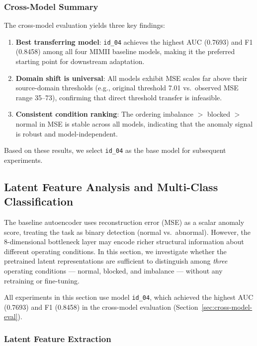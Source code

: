 \documentclass[12pt, a4paper]{article}
\begin{document}
\subsubsection{Cross-Model Summary}

The cross-model evaluation yields three key findings:
\begin{enumerate}
    \item \textbf{Best transferring model}: \texttt{id\_04} achieves the highest AUC (0.7693) and F1 (0.8458) among all four MIMII baseline models, making it the preferred starting point for downstream adaptation.
    \item \textbf{Domain shift is universal}: All models exhibit MSE scales far above their source-domain thresholds (e.g., original threshold 7.01 vs.\ observed MSE range 35--73), confirming that direct threshold transfer is infeasible.
    \item \textbf{Consistent condition ranking}: The ordering imbalance $>$ blocked $>$ normal in MSE is stable across all models, indicating that the anomaly signal is robust and model-independent.
\end{enumerate}

Based on these results, we select \texttt{id\_04} as the base model for subsequent experiments.


\subsection{Latent Feature Analysis and Multi-Class Classification}
\label{sec:latent-analysis}

The baseline autoencoder uses reconstruction error (MSE) as a scalar anomaly score, treating the task as binary detection (normal vs.\ abnormal). However, the 8-dimensional bottleneck layer may encode richer structural information about different operating conditions. In this section, we investigate whether the pretrained latent representations are sufficient to distinguish among \emph{three} operating conditions --- normal, blocked, and imbalance --- without any retraining or fine-tuning.

All experiments in this section use model \texttt{id\_04}, which achieved the highest AUC (0.7693) and F1 (0.8458) in the cross-model evaluation (Section~\ref{sec:cross-model-eval}).

\subsubsection{Latent Feature Extraction}
\end{document}
